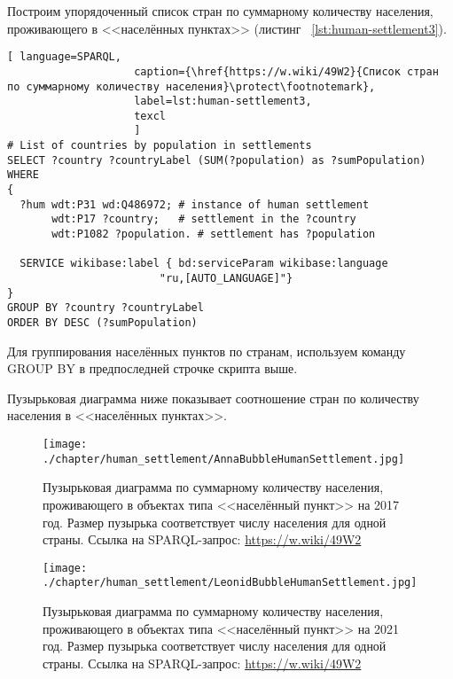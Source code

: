 Построим упорядоченный список стран по суммарному количеству населения, проживающего в <<населённых пунктах>> (листинг ~\protect\ref{lst:human-settlement3}).

\begin{lstlisting}[ language=SPARQL, 
                    caption={\href{https://w.wiki/49W2}{Список стран по суммарному количеству населения}\protect\footnotemark},
                    label=lst:human-settlement3,
                    texcl 
                    ]
# List of countries by population in settlements
SELECT ?country ?countryLabel (SUM(?population) as ?sumPopulation)
WHERE
{
  ?hum wdt:P31 wd:Q486972; # instance of human settlement
       wdt:P17 ?country;   # settlement in the ?country
       wdt:P1082 ?population. # settlement has ?population
  
  SERVICE wikibase:label { bd:serviceParam wikibase:language 
						"ru,[AUTO_LANGUAGE]"}
}
GROUP BY ?country ?countryLabel 
ORDER BY DESC (?sumPopulation)
\end{lstlisting}%

Для группирования населённых пунктов по странам, используем команду GROUP BY в предпоследней строчке скрипта выше.

Пузырьковая диаграмма ниже показывает соотношение стран по количеству населения в <<населённых пунктах>>.

\begin{figure}
\centering
	\texttt{[image: ./chapter/human\_settlement/AnnaBubbleHumanSettlement.jpg]}
	\label{fig:human-settlement-1}
    \caption[Пузырьковая диаграмма  по суммарному количеству населения в населённых пунктах, 2017.]{Пузырьковая диаграмма  по суммарному количеству населения, проживающего в объектах типа <<населённый пункт>> на 2017 год. Размер пузырька соответствует числу населения для одной страны. Ссылка на SPARQL-запрос: \href{https://w.wiki/49W2}{https://w.wiki/49W2}}
\end{figure}

\begin{figure}
\centering
	\texttt{[image: ./chapter/human\_settlement/LeonidBubbleHumanSettlement.jpg]}
	\label{fig:human-settlement-2}
	\caption[Пузырьковая диаграмма  по суммарному количеству населения в населённых пунктах, 2021.]{Пузырьковая диаграмма  по суммарному количеству населения, проживающего в объектах типа <<населённый пункт>> на 2021 год. Размер пузырька соответствует числу населения для одной страны. Ссылка на SPARQL-запрос: \href{https://w.wiki/49W2}{https://w.wiki/49W2}}
\end{figure}

